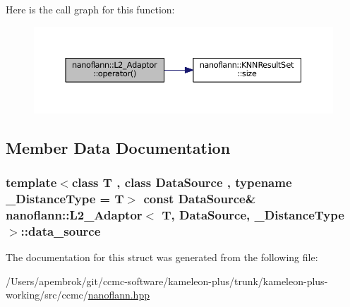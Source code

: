 Here is the call graph for this function\-:\nopagebreak
\begin{figure}[H]
\begin{center}
\leavevmode
\includegraphics[width=350pt]{structnanoflann_1_1_l2___adaptor_a70fe24865199691cf988d83ccc76cee8_cgraph}
\end{center}
\end{figure}




\subsection{Member Data Documentation}
\hypertarget{structnanoflann_1_1_l2___adaptor_aa108fd57fd3336ea825cb62f7f5b531b}{
\subsubsection[{data\-\_\-source}]{\setlength{\rightskip}{0pt plus 5cm}template$<$class T , class Data\-Source , typename \-\_\-\-Distance\-Type  = T$>$ const Data\-Source\& {\bf nanoflann\-::\-L2\-\_\-\-Adaptor}$<$ T, Data\-Source, \-\_\-\-Distance\-Type $>$\-::data\-\_\-source}}\label{structnanoflann_1_1_l2___adaptor_aa108fd57fd3336ea825cb62f7f5b531b}


The documentation for this struct was generated from the following file\-:\begin{DoxyCompactItemize}
\item 
/\-Users/apembrok/git/ccmc-\/software/kameleon-\/plus/trunk/kameleon-\/plus-\/working/src/ccmc/\hyperlink{nanoflann_8hpp}{nanoflann.\-hpp}\end{DoxyCompactItemize}
